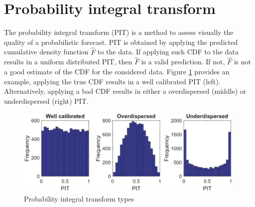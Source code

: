 \section{Probability integral transform}
The probability integral transform (PIT) is a method to assess visually the quality of a probabilistic forecast. PIT is obtained by applying the predicted cumulative density function $\hat{F}$ to the data. If applying such CDF to the data results in a uniform distributed PIT, then $\hat{F}$ is a valid prediction. If not, $\hat{F}$ is not a good estimate of the CDF for the considered data. Figure \ref{fig:pit} provides an example, applying the true CDF results in a well calibrated PIT (left). Alternatively, applying a bad CDF results in either a overdispersed (middle) or underdispersed (right) PIT.
\begin{figure}
    \includegraphics[width=\textwidth]{images/pit.png}
    \caption{Probability integral transform types \cite{haben2023core}}
    \label{fig:pit}
  \end{figure}
\\

